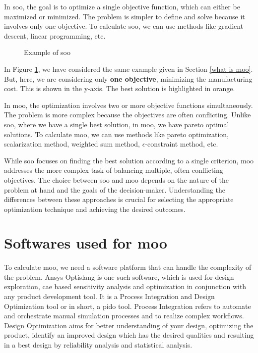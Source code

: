 In \acrfull{soo}, the goal is to optimize a single objective function, which can either be maximized or minimized. The  problem is simpler to define and solve
because it involves only one objective. To calculate \acrshort{soo}, we can use methods like gradient descent, linear programming, etc.

\begin{figure}[!h]
    \centering
    
    \caption{Example of \acrshort{soo}}
    \label{soo}
\end{figure}

In Figure \ref{soo}, we have considered the same example given in Section \ref{what is moo}. But, here, we are considering only \textbf{one objective}, minimizing 
the manufacturing cost. This is shown in the y-axis. The best solution is highlighted in orange.

In \acrshort{moo}, the optimization involves two or more objective functions simultaneously. The problem is more complex because the objectives are often
conflicting. Unlike \acrshort{soo}, where we have a single best solution, in \acrshort{moo}, we have pareto optimal solutions.
To calculate \acrshort{moo}, we can use methods like pareto optimization, scalarization method, weighted sum method, $\epsilon$-constraint method, etc.


While \acrshort{soo} focuses on finding the best solution according to a single criterion, \acrshort{moo} addresses the more complex task of balancing multiple, 
often conflicting objectives. The choice between \acrshort{soo} and \acrshort{moo} depends on the nature of the problem at hand and the goals of the decision-maker. 
Understanding the differences between these approaches is crucial for selecting the appropriate optimization technique and achieving the desired outcomes.

\section{Softwares used for \acrlong{moo}}
\paragraph{}

To calculate \acrshort{moo}, we need a software platform that can handle the complexity of the problem. Ansys Optislang \cite{optislang} is one such software,  
which is used for design exploration, \acrfull{cae} based sensitivity analysis and optimization in conjunction with any product development tool. 
It is a Process Integration and Design Optimization tool or in short, a \acrshort{pido} tool. Process Integration refers to automate and orchestrate manual 
simulation processes and to realize complex workflows. Design Optimization aims for better understanding of your design, optimizing the product, identify an 
improved design which has the desired qualities and resulting in a best design by reliability analysis and statistical analysis.  


